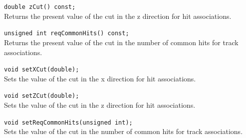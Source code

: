 \begin{Entry}
    \verb+double zCut() const;+\\
    Returns the present value of the cut in the z direction for hit associations.

    \verb+unsigned int reqCommonHits() const;+\\
    Returns the present value of the cut in the number of common hits for track associations.

    \verb+void setXCut(double);+\\
    Sets the value of the cut in the x direction for hit associations.

    \verb+void setZCut(double);+\\
    Sets the value of the cut in the z direction for hit associations.

    \verb+void setReqCommonHits(unsigned int);+\\
    Sets the value of the cut in the number of common hits for track associations.

\end{Entry}


%
%
